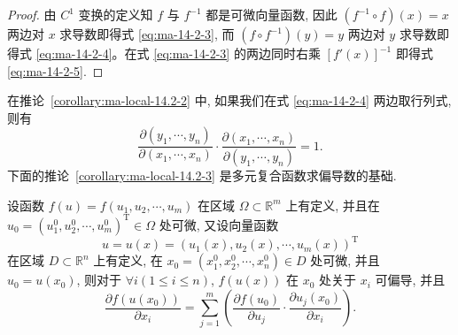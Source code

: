 \begin{proof}
由 $C^1$ 变换的定义知 $f$ 与 $f^{-1}$ 都是可微向量函数, 因此 $(f^{-1}\circ f)(x)=x$ 两边对 $x$ 求导数即得式 \eqref{eq:ma-14-2-3}, 而 $(f\circ f^{-1})(y)=y$ 两边对 $y$ 求导数即得式 \eqref{eq:ma-14-2-4}。在式 \eqref{eq:ma-14-2-3} 的两边同时右乘 $[f'(x)]^{-1}$ 即得式 \eqref{eq:ma-14-2-5}.
\end{proof}


\begin{remark}\label{remark:ma-14-source-43}
在推论~\ref{corollary:ma-local-14.2-2} 中, 如果我们在式 \eqref{eq:ma-14-2-4} 两边取行列式, 则有
\begin{equation}
  \frac{\partial(y_1,\cdots,y_n)}{\partial(x_1,\cdots,x_n)}
  \cdot
  \frac{\partial(x_1,\cdots,x_n)}{\partial(y_1,\cdots,y_n)}
  =1.
\label{eq:ma-14-2-6}
\end{equation}
下面的推论~\ref{corollary:ma-local-14.2-3} 是多元复合函数求偏导数的基础.
\end{remark}


\begin{corollary}\label{corollary:ma-local-14.2-3}
设函数 $f(u)=f(u_1,u_2,\cdots,u_m)$ 在区域 $\Omega\subset\mathbb R^m$ 上有定义, 并且在 $u_0=(u_1^0,u_2^0,\cdots,u_m^0)^\mathrm T\in\Omega$ 处可微, 又设向量函数
\[
  u=u(x)=(u_1(x),u_2(x),\cdots,u_m(x))^\mathrm T
\]
在区域 $D\subset\mathbb R^n$ 上有定义, 在 $x_0=(x_1^0,x_2^0,\cdots,x_n^0)\in D$ 处可微, 并且 $u_0=u(x_0)$, 则对于 $\forall i(1\leqslant i\leqslant n)$, $f(u(x))$ 在 $x_0$ 处关于 $x_i$ 可偏导, 并且
\[
  \frac{\partial f(u(x_0))}{\partial x_i}
  =\sum_{j=1}^m\left(
  \frac{\partial f(u_0)}{\partial u_j}\cdot
  \frac{\partial u_j(x_0)}{\partial x_i}\right).
\]
\end{corollary}


